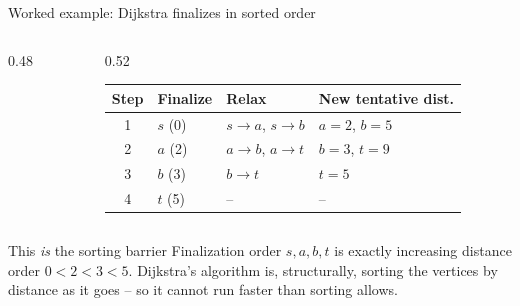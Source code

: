 \documentclass[11pt,aspectratio=169]{beamer}
\begin{document}
\begin{frame}{Worked example: Dijkstra finalizes in sorted order}
  \begin{columns}
  \begin{column}{0.48\textwidth}
  \begin{center}
  \end{center}
  \end{column}
  \begin{column}{0.52\textwidth}
  \small
  \begin{tabular}{@{}clll@{}}
    \toprule
    Step & Finalize & Relax & New tentative dist. \\
    \midrule
    1 & $s$ (0) & $s\to a$, $s\to b$ & $a{=}2$, $b{=}5$ \\
    2 & $a$ (2) & $a\to b$, $a\to t$ & $b{=}3$, $t{=}9$ \\
    3 & $b$ (3) & $b\to t$ & $t{=}5$ \\
    4 & $t$ (5) & -- & -- \\
    \bottomrule
  \end{tabular}
  \end{column}
  \end{columns}
  \vspace{0.5em}
  \begin{exampleblock}{This \emph{is} the sorting barrier}
    Finalization order $s, a, b, t$ is exactly increasing distance order
    $0 < 2 < 3 < 5$. Dijkstra's algorithm is, structurally, sorting the vertices by
    distance as it goes -- so it cannot run faster than sorting allows.
  \end{exampleblock}
\end{frame}
\end{document}

